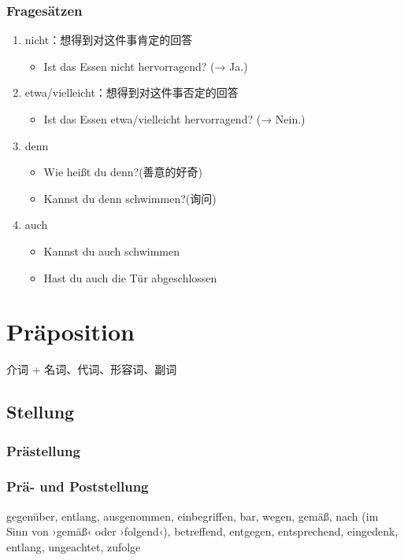 \documentclass[UTF8]{report}
\begin{document}
\subsection{Fragesätzen}
\begin{enumerate}
    \item nicht：想得到对这件事肯定的回答
    \begin{itemize}
        \item Ist das Essen nicht hervorragend? (→ Ja.)
    \end{itemize}
    \item etwa/vielleicht：想得到对这件事否定的回答
    \begin{itemize}
        \item Ist das Essen etwa/vielleicht hervorragend? (→ Nein.)
    \end{itemize}
    \item denn
    \begin{itemize}
        \item Wie heißt du denn?(善意的好奇)
        \item Kannst du denn schwimmen?(询问)
    \end{itemize}
    \item auch
    \begin{itemize}
        \item Kannst du auch schwimmen
        \item Hast du auch die Tür abgeschlossen
    \end{itemize}
\end{enumerate}


\chapter{Präposition}
介词 + 名词、代词、形容词、副词

\section{Stellung}
\subsection{Prästellung}

\subsection{Prä- und Poststellung}

gegenüber, entlang, ausgenommen, einbegriffen, bar, wegen, gemäß, nach (im Sinn von ›gemäß‹ oder ›folgend‹), betreffend, entgegen, entsprechend, eingedenk, entlang, ungeachtet, zufolge
\end{document}
